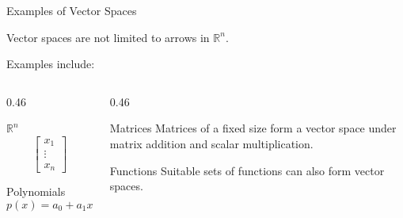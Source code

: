 \begin{frame}{Examples of Vector Spaces}

Vector spaces are not limited to arrows in $\mathbb{R}^n$.

Examples include:

\begin{columns}[T,totalwidth=\textwidth]

\begin{column}{0.46\textwidth}

\begin{block}{$\mathbb{R}^n$}
\[
\begin{bmatrix}
x_1\\
\vdots\\
x_n
\end{bmatrix}
\]
\end{block}

\begin{block}{Polynomials}
\[
p(x)=a_0+a_1x+\cdots+a_nx^n
\]
\end{block}

\end{column}

\begin{column}{0.46\textwidth}

\begin{block}{Matrices}
Matrices of a fixed size form a vector space under
matrix addition and scalar multiplication.
\end{block}

\begin{block}{Functions}
Suitable sets of functions can also form vector spaces.
\end{block}

\end{column}

\end{columns}

\end{frame}



